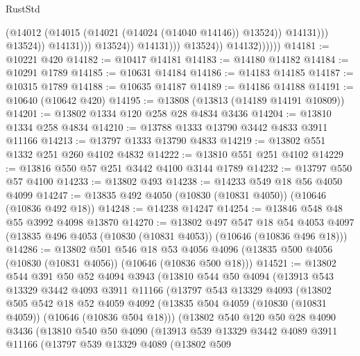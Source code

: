 \begin{lexlean}{RustStd}
\begin{coremodule}
                                            (@14012
                                              (@14015 (@14021 (@14024 (@14040 @14146)) @13524))
                                              @14131)))
                                        @13524))
                                    @14131)))
                              @13524))
                          @14131)))
                    @13524))
                @14132))))))
@14181 := @10221 @420
@14182 := @10417 @14181
@14183 := @14180 @14182
@14184 := @10291 @1789
@14185 := @10631 @14184
@14186 := @14183 @14185
@14187 := @10315 @1789
@14188 := @10635 @14187
@14189 := @14186 @14188
@14191 := @10640 (@10642 @420)
@14195 := @13808 (@13813 (@14189 @14191 @10809))
@14201 := @13802 @1334 @120 @258 @28 @4834 @3436
@14204 := @13810 @1334 @258 @4834
@14210 := @13788 @1333 @13790 @3442 @4833 @3911 @11166
@14213 := @13797 @1333 @13790 @4833
@14219 := @13802 @551 @1332 @251 @260 @4102 @4832
@14222 := @13810 @551 @251 @4102
@14229 := @13816 @550 @57 @251 @3442 @4100 @3144 @1789
@14232 := @13797 @550 @57 @4100
@14233 := @13802 @493
@14238 := @14233 @549 @18 @56 @4050 @4099
@14247 := @13835 @492 @4050 (@10830 (@10831 @4050)) (@10646 (@10836 @492 @18))
@14248 := @14238 @14247
@14254 := @13846 @548 @48 @55 @3992 @4098 @13870
@14270 := @13802
    @497
    @547
    @18
    @54
    @4053
    @4097
    (@13835 @496 @4053 (@10830 (@10831 @4053)) (@10646 (@10836 @496 @18)))
@14286 := @13802
    @501
    @546
    @18
    @53
    @4056
    @4096
    (@13835 @500 @4056 (@10830 (@10831 @4056)) (@10646 (@10836 @500 @18)))
@14521 := @13802
    @544
    @391
    @50
    @52
    @4094
    @3943
    (@13810
      @544
      @50
      @4094
      (@13913
        @543
        @13329
        @3442
        @4093
        @3911
        @11166
        (@13797
          @543
          @13329
          @4093
          (@13802
            @505
            @542
            @18
            @52
            @4059
            @4092
            (@13835 @504 @4059 (@10830 (@10831 @4059)) (@10646 (@10836 @504 @18)))
            (@13802
              @540
              @120
              @50
              @28
              @4090
              @3436
              (@13810
                @540
                @50
                @4090
                (@13913
                  @539
                  @13329
                  @3442
                  @4089
                  @3911
                  @11166
                  (@13797
                    @539
                    @13329
                    @4089
                    (@13802
                      @509

\end{coremodule}
\end{lexlean}

